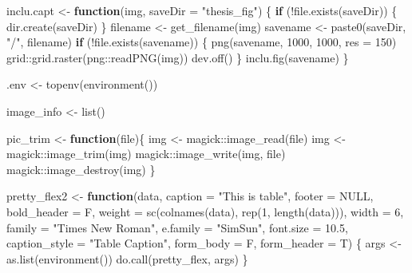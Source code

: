 \documentclass[
]{article}
\newenvironment{Shaded}{\begin{snugshade}}{\end{snugshade}}
\newcommand{\AttributeTok}[1]{\textcolor[rgb]{0.77,0.63,0.00}{#1}}
\newcommand{\ConstantTok}[1]{\textcolor[rgb]{0.00,0.00,0.00}{#1}}
\newcommand{\ControlFlowTok}[1]{\textcolor[rgb]{0.13,0.29,0.53}{\textbf{#1}}}
\newcommand{\DecValTok}[1]{\textcolor[rgb]{0.00,0.00,0.81}{#1}}
\newcommand{\FloatTok}[1]{\textcolor[rgb]{0.00,0.00,0.81}{#1}}
\newcommand{\FunctionTok}[1]{\textcolor[rgb]{0.00,0.00,0.00}{#1}}
\newcommand{\NormalTok}[1]{#1}
\newcommand{\OtherTok}[1]{\textcolor[rgb]{0.56,0.35,0.01}{#1}}
\newcommand{\SpecialCharTok}[1]{\textcolor[rgb]{0.00,0.00,0.00}{#1}}
\newcommand{\StringTok}[1]{\textcolor[rgb]{0.31,0.60,0.02}{#1}}
\begin{document}
\begin{Shaded}
\begin{Highlighting}[]
\NormalTok{inclu.capt }\OtherTok{\textless{}{-}} \ControlFlowTok{function}\NormalTok{(img, }\AttributeTok{saveDir =} \StringTok{"thesis\_fig"}\NormalTok{) \{}
  \ControlFlowTok{if}\NormalTok{ (}\SpecialCharTok{!}\FunctionTok{file.exists}\NormalTok{(saveDir)) \{}
    \FunctionTok{dir.create}\NormalTok{(saveDir)}
\NormalTok{  \}}
\NormalTok{  filename }\OtherTok{\textless{}{-}} \FunctionTok{get\_filename}\NormalTok{(img)}
\NormalTok{  savename }\OtherTok{\textless{}{-}} \FunctionTok{paste0}\NormalTok{(saveDir, }\StringTok{"/"}\NormalTok{, filename)}
  \ControlFlowTok{if}\NormalTok{ (}\SpecialCharTok{!}\FunctionTok{file.exists}\NormalTok{(savename)) \{}
    \FunctionTok{png}\NormalTok{(savename, }\DecValTok{1000}\NormalTok{, }\DecValTok{1000}\NormalTok{, }\AttributeTok{res =} \DecValTok{150}\NormalTok{)}
\NormalTok{    grid}\SpecialCharTok{::}\FunctionTok{grid.raster}\NormalTok{(png}\SpecialCharTok{::}\FunctionTok{readPNG}\NormalTok{(img))}
    \FunctionTok{dev.off}\NormalTok{()}
\NormalTok{  \}}
  \FunctionTok{inclu.fig}\NormalTok{(savename)}
\NormalTok{\}}

\NormalTok{.env }\OtherTok{\textless{}{-}} \FunctionTok{topenv}\NormalTok{(}\FunctionTok{environment}\NormalTok{())}

\NormalTok{image\_info }\OtherTok{\textless{}{-}} \FunctionTok{list}\NormalTok{()}

\NormalTok{pic\_trim }\OtherTok{\textless{}{-}} \ControlFlowTok{function}\NormalTok{(file)\{}
\NormalTok{  img }\OtherTok{\textless{}{-}}\NormalTok{ magick}\SpecialCharTok{::}\FunctionTok{image\_read}\NormalTok{(file)}
\NormalTok{  img }\OtherTok{\textless{}{-}}\NormalTok{ magick}\SpecialCharTok{::}\FunctionTok{image\_trim}\NormalTok{(img)}
\NormalTok{  magick}\SpecialCharTok{::}\FunctionTok{image\_write}\NormalTok{(img, file)}
\NormalTok{  magick}\SpecialCharTok{::}\FunctionTok{image\_destroy}\NormalTok{(img)}
\NormalTok{\}}

\NormalTok{pretty\_flex2 }\OtherTok{\textless{}{-}} \ControlFlowTok{function}\NormalTok{(data,}
  \AttributeTok{caption =} \StringTok{"This is table"}\NormalTok{, }\AttributeTok{footer =} \ConstantTok{NULL}\NormalTok{,  }\AttributeTok{bold\_header =}\NormalTok{ F,}
  \AttributeTok{weight =} \FunctionTok{sc}\NormalTok{(}\FunctionTok{colnames}\NormalTok{(data), }\FunctionTok{rep}\NormalTok{(}\DecValTok{1}\NormalTok{, }\FunctionTok{length}\NormalTok{(data))), }\AttributeTok{width =} \DecValTok{6}\NormalTok{,}
  \AttributeTok{family =} \StringTok{"Times New Roman"}\NormalTok{, }\AttributeTok{e.family =} \StringTok{"SimSun"}\NormalTok{, }\AttributeTok{font.size =} \FloatTok{10.5}\NormalTok{,}
  \AttributeTok{caption\_style =} \StringTok{"Table Caption"}\NormalTok{, }\AttributeTok{form\_body =}\NormalTok{ F, }\AttributeTok{form\_header =}\NormalTok{ T)}
\NormalTok{\{}
\NormalTok{  args }\OtherTok{\textless{}{-}} \FunctionTok{as.list}\NormalTok{(}\FunctionTok{environment}\NormalTok{())}
  \FunctionTok{do.call}\NormalTok{(pretty\_flex, args)}
\NormalTok{\}}


\end{Highlighting}
\end{Shaded}
\end{document}
